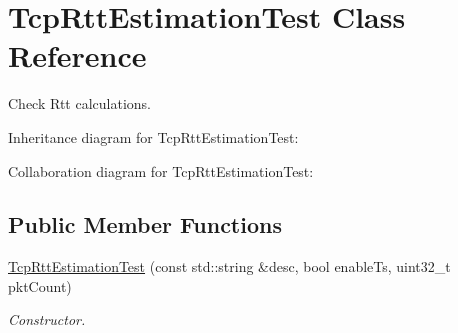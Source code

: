 \hypertarget{classTcpRttEstimationTest}{}\section{Tcp\+Rtt\+Estimation\+Test Class Reference}
\label{classTcpRttEstimationTest}


Check Rtt calculations.  




Inheritance diagram for Tcp\+Rtt\+Estimation\+Test\+:


Collaboration diagram for Tcp\+Rtt\+Estimation\+Test\+:
\subsection*{Public Member Functions}
\begin{DoxyCompactItemize}
\item 
\hyperlink{classTcpRttEstimationTest_a0a263ad6e8dae777597b9d18203e6231}{Tcp\+Rtt\+Estimation\+Test} (const std\+::string \&desc, bool enable\+Ts, uint32\+\_\+t pkt\+Count)
\begin{DoxyCompactList}\small\item\em Constructor. \end{DoxyCompactList}\end{DoxyCompactItemize}
